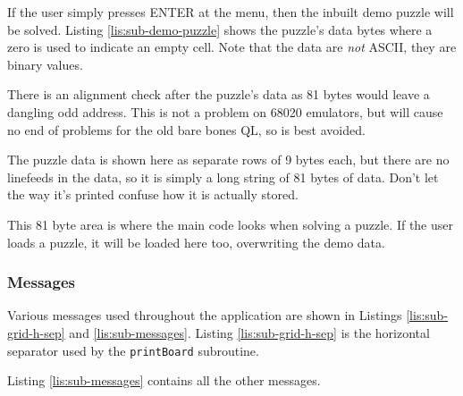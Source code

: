 If the user simply presses ENTER at the menu, then the inbuilt demo
puzzle will be solved. Listing \ref{lis:sub-demo-puzzle} shows the
puzzle's data bytes where a zero is used to indicate an empty cell.
Note that the data are \emph{not} ASCII, they are binary values.



There is an alignment check after the puzzle's data as 81 bytes would
leave a dangling odd address. This is not a problem on 68020 emulators,
but will cause no end of problems for the old bare bones QL, so is
best avoided.

The puzzle data is shown here as separate rows of 9 bytes each, but
there are no linefeeds in the data, so it is simply a long string
of 81 bytes of data. Don't let the way it's printed confuse how it
is actually stored.

This 81 byte area is where the main code looks when solving a puzzle.
If the user loads a puzzle, it will be loaded here too, overwriting
the demo data.

\subsubsection{Messages}

Various messages used throughout the application are shown in Listings
\ref{lis:sub-grid-h-sep} and \ref{lis:sub-messages}. Listing \ref{lis:sub-grid-h-sep}
is the horizontal separator used by the \texttt{printBoard} subroutine.



Listing \ref{lis:sub-messages} contains all the other messages.


